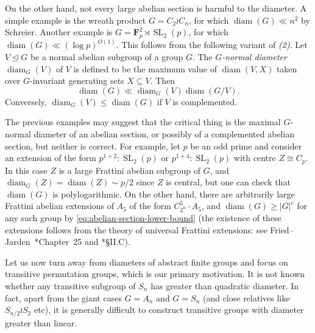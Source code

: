 \documentclass[11pt,reqno]{amsart}
\numberwithin{equation}{section}
\theoremstyle{definition}
\theoremstyle{remark}
\def\F{\mathbf{F}} %
\newcommand\opr[1]{\operatorname{#1}}
\def\SL{\opr{SL}}
\def\diam{\opr{diam}}
\def\nsgp{\trianglelefteq}
\numberwithin{equation}{section}
\begin{document}
On the other hand, not every large abelian section is harmful to the diameter.
A simple example is the wreath product $G = C_2 \wr C_n$, for which $\diam(G) \ll n^2$ by Schreier.
Another example is $G = \F_p^2 \rtimes \SL_2(p)$, for which $\diam(G) \ll (\log p)^{O(1)}$.
This follows from the following variant of \emph{(2)}.
Let $V \nsgp G$ be a normal abelian subgroup of a group $G$. The \emph{$G$-normal diameter} $\diam_G(V)$ of $V$ is defined to be the maximum value of $\diam(V, X)$ taken over $G$-invariant generating sets $X \subseteq V$. Then
\[
\diam(G) \ll \diam_G(V) \diam(G/V).
\]
Conversely, $\diam_G(V) \le \diam(G)$ if $V$ is complemented.

The previous examples may suggest that the critical thing is the maximal $G$-normal diameter of an abelian section, or possibly of a complemented abelian section, but neither is correct.
For example, let $p$ be an odd prime and consider an extension of the form $p^{1+2} : \SL_2(p)$ or $p^{1 + 4} : \SL_2(p)$ with centre $Z \cong C_p$.
In this case $Z$ is a large Frattini abelian subgroup of $G$, and $\diam_G(Z) = \diam(Z) \sim p/2$ since $Z$ is central, but one can check that $\diam(G)$ is polylogarithmic.
On the other hand, there are arbitrarily large Frattini abelian extensions of $A_5$ of the form $C_{2^n}^5 \cdot A_5$,
and $\diam(G) \ge |G|^c$ for any such group by \eqref{eq:abelian-section-lower-bound}
(the existence of these extensions follows from the theory of universal Frattini extensions: see Fried--Jarden~\cite{fried-jarden}*{Chapter~25} and \cite{fri95}*{\S{}II.C}).

Let us now turn away from diameters of abstract finite groups and focus on transitive permutation groups, which is our primary motivation.
It is not known whether any transitive subgroup of $S_n$ has greater than quadratic diameter.
In fact, apart from the giant cases $G = A_n$ and $G = S_n$ (and close relatives like $S_{n/2} \wr S_2$ etc),
it is generally difficult to construct transitive groups with diameter greater than linear.
\end{document}

